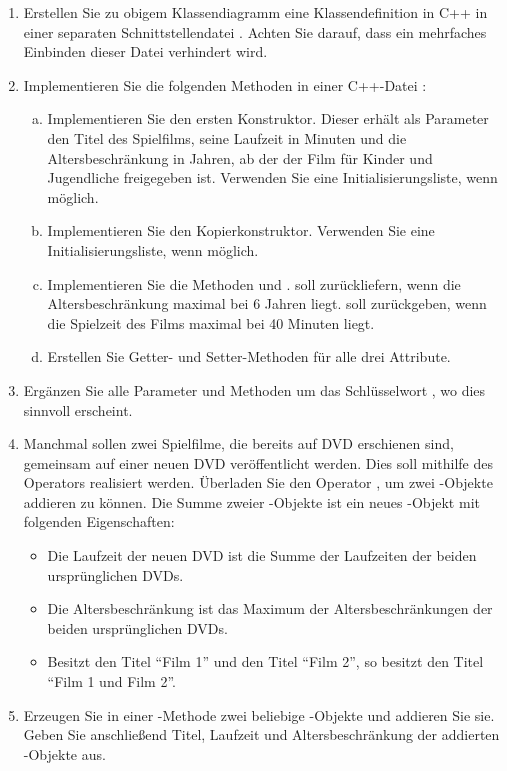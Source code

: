 \begin{enumerate}
	\item Erstellen Sie zu obigem Klassendiagramm eine Klassendefinition in C++ in einer separaten Schnittstellendatei .
	Achten Sie darauf, dass ein mehrfaches Einbinden dieser Datei verhindert wird.
	\item Implementieren Sie die folgenden Methoden in einer C++-Datei :
	\begin{enumerate}[(a)]
		\item Implementieren Sie den ersten Konstruktor. Dieser erhält als Parameter den Titel des Spielfilms, seine Laufzeit in Minuten und die Altersbeschränkung in Jahren, ab der der Film für Kinder und Jugendliche freigegeben ist.
		Verwenden Sie eine Initialisierungsliste, wenn möglich.
		\item Implementieren Sie den Kopierkonstruktor. Verwenden Sie eine Initialisierungsliste, wenn möglich.
		\item Implementieren Sie die Methoden  und .  soll  zurückliefern, wenn die Altersbeschränkung maximal bei 6 Jahren liegt.  soll  zurückgeben, wenn die Spielzeit des Films maximal bei 40 Minuten liegt.
		\item Erstellen Sie Getter- und Setter-Methoden für alle drei Attribute.
	\end{enumerate}
	\item Ergänzen Sie alle Parameter und Methoden um das Schlüsselwort , wo dies sinnvoll erscheint.
	\item Manchmal sollen zwei Spielfilme, die bereits auf DVD erschienen sind, gemeinsam auf einer neuen DVD veröffentlicht werden.
	Dies soll mithilfe des Operators \code{+} realisiert werden.
	Überladen Sie den Operator \code{+}, um zwei -Objekte addieren zu können. Die Summe zweier -Objekte ist ein neues -Objekt mit folgenden Eigenschaften:
	\begin{itemize}
		\item Die Laufzeit der neuen DVD ist die Summe der Laufzeiten der beiden ursprünglichen DVDs.
		\item Die Altersbeschränkung ist das Maximum der Altersbeschränkungen der beiden ursprünglichen DVDs.
		\item Besitzt  den Titel \enquote{Film 1} und  den Titel \enquote{Film 2}, so besitzt  den Titel \enquote{Film 1 und Film 2}.
	\end{itemize} 
	\item Erzeugen Sie in einer -Methode zwei beliebige -Objekte und addieren Sie sie. Geben Sie anschließend Titel, Laufzeit und Altersbeschränkung der addierten -Objekte aus.
\end{enumerate}
